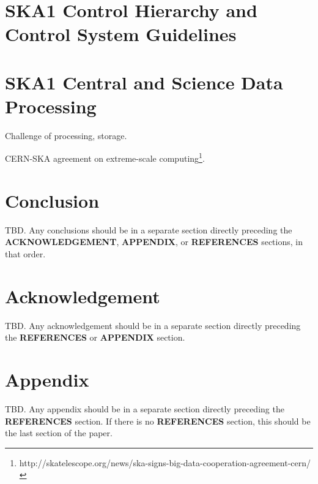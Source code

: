 \documentclass[a4paper,
               biblatex,       %
               keeplastbox,    %
               ]{jacow-2_1}    %
\newcommand\SEC[1]{\textbf{\uppercase{#1}}}
\begin{document}

\section{SKA1 Control Hierarchy and Control System Guidelines} %
\label{sec:ska1_control_hierarchy_and_control_system_guidelines}


\section{SKA1 Central and Science Data Processing} %
\label{sec:ska1_central_and_science_data_processing}

Challenge of processing, storage.

CERN-SKA agreement on extreme-scale computing\footnote{http://skatelescope.org/news/ska-signs-big-data-cooperation-agreement-cern/}.


\section{Conclusion} %
\label{sec:conclusion}
TBD. Any conclusions should be in a separate section directly preceding
the \SEC{Acknowledgement}, \SEC{Appendix}, or \SEC{References} sections, in that
order.


\section{Acknowledgement} %
\label{sec:acknowledgement}
TBD. Any acknowledgement should be in a separate section directly preceding
the \SEC{References} or \SEC{Appendix} section.


\section{Appendix} %
\label{sec:appendix}
TBD. Any appendix should be in a separate section directly preceding
the \SEC{References} section. If there is no \SEC{References} section,
this should be the last section of the paper.



\label{sec:references}
\printbibliography

\end{document}
